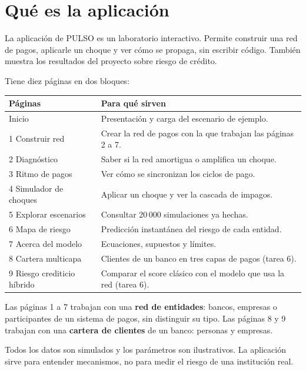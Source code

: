 \section{Qué es la aplicación}

La aplicación de PULSO es un laboratorio interactivo. Permite construir una red de
pagos, aplicarle un choque y ver cómo se propaga, sin escribir código. También muestra
los resultados del proyecto sobre riesgo de crédito.

Tiene diez páginas en dos bloques:

\begin{center}
\small
\begin{tabular}{p{}p{}}
\toprule
\textbf{Páginas} & \textbf{Para qué sirven} \\
\midrule
Inicio & Presentación y carga del escenario de ejemplo. \\
1 Construir red & Crear la red de pagos con la que trabajan las páginas 2 a 7. \\
2 Diagnóstico & Saber si la red amortigua o amplifica un choque. \\
3 Ritmo de pagos & Ver cómo se sincronizan los ciclos de pago. \\
4 Simulador de choques & Aplicar un choque y ver la cascada de impagos. \\
5 Explorar escenarios & Consultar 20\,000 simulaciones ya hechas. \\
6 Mapa de riesgo & Predicción instantánea del riesgo de cada entidad. \\
7 Acerca del modelo & Ecuaciones, supuestos y límites. \\
\midrule
8 Cartera multicapa & Clientes de un banco en tres capas de pagos (tarea 6). \\
9 Riesgo crediticio híbrido & Comparar el score clásico con el modelo que usa la red
(tarea 6). \\
\bottomrule
\end{tabular}
\end{center}

Las páginas 1 a 7 trabajan con una \textbf{red de entidades}: bancos, empresas o
participantes de un sistema de pagos, sin distinguir su tipo. Las páginas 8 y 9 trabajan
con una \textbf{cartera de clientes} de un banco: personas y empresas.

\begin{aviso}
Todos los datos son simulados y los parámetros son ilustrativos. La aplicación sirve
para entender mecanismos, no para medir el riesgo de una institución real.
\end{aviso}

